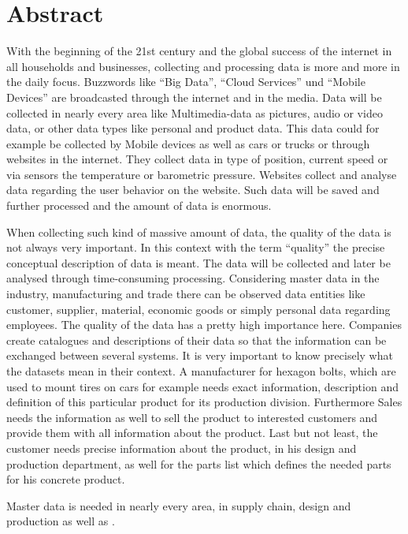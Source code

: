 \chapter*{Abstract}


With the beginning of the 21st century and the global success of the internet in all households and businesses, collecting and processing data is more and more in the daily focus. Buzzwords like \enquote{Big Data}, \enquote{Cloud Services} und \enquote{Mobile Devices} are broadcasted through the internet and in the media. Data will be collected in nearly every area like Multimedia-data as pictures, audio or video data, or other data types like personal and product data. This data could for example be collected by Mobile devices as well as cars or trucks or through websites in the internet. They collect data in type of position, current speed or via sensors the temperature or barometric pressure. Websites collect and analyse data regarding the user behavior on the website. Such data will be saved and further processed and the amount of data is enormous. 

When collecting such kind of massive amount of data, the quality of the data is not always very important. In this context with the term \enquote{quality} the precise conceptual description of data is meant. The data will be collected and later be analysed through time-consuming processing. 
Considering master data in the industry, manufacturing and trade there can be observed data entities like customer, supplier, material, economic goods or simply personal data regarding employees. The quality of the data has a pretty high importance here. Companies create catalogues and descriptions of their data so that the information can be exchanged between several systems. It is very important to know precisely what the datasets mean in their context. A manufacturer for hexagon bolts, which are used to mount tires on cars for example needs exact information, description and definition of this particular product for its production division. Furthermore Sales needs the information as well to sell the product to interested customers and provide them with all information about the product. Last but not least, the customer needs precise information about the product, in his design and production department, as well for the parts list which defines the needed parts for his concrete product. 

Master data is needed in nearly every area, in supply chain, design and production as well as . 

